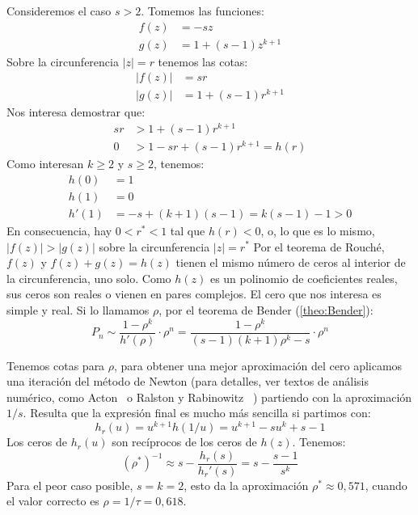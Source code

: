   Consideremos el caso \(s > 2\).
  Tomemos las funciones:
  \begin{align*}
    f(z)
      &= -s z \\
    g(z)
      &= 1 + (s - 1) z^{k + 1}
  \end{align*}
  Sobre la circunferencia \(\lvert z \rvert = r\)
  tenemos las cotas:
  \begin{align*}
    \lvert f(z) \rvert
      &= s r \\
    \lvert g(z) \rvert
      &= 1 + (s - 1) r^{k + 1}
  \end{align*}
  Nos interesa demostrar que:
  \begin{align*}
    s r
      &> 1 + (s - 1) r^{k + 1} \\
    0 &> 1 - s r + (s - 1) r^{k + 1}
       = h(r)
  \end{align*}
  Como interesan \(k \ge 2\) y \(s \ge 2\),
  tenemos:
  \begin{align*}
    h(0)
      &= 1 \\
    h(1)
      &= 0 \\
    h'(1)
      &= - s + (k + 1) (s - 1)
       = k (s - 1) - 1
       > 0
  \end{align*}
  En consecuencia,
  hay \(0 < r^* < 1\) tal que \(h(r) < 0\),
  o,
  lo que es lo mismo,
  \(\lvert f(z) \rvert > \lvert g(z) \rvert\)
  sobre la circunferencia \(\lvert z \rvert = r^*\)
  Por el teorema de Rouché,
  \(f(z)\) y \(f(z) + g(z) = h(z)\) tienen el mismo número de ceros
  al interior de la circunferencia,
  uno solo.
  Como \(h(z)\) es un polinomio de coeficientes reales,
  sus ceros son reales o vienen en pares complejos.
  El cero que nos interesa es simple y real.
  Si lo llamamos \(\rho\),
  por el teorema de Bender
  (\ref{theo:Bender}):
  \begin{equation}
    \label{eq:asymptotic-strings-no-ak}
    P_n
      \sim \frac{1 - \rho^k}{h'(\rho)} \cdot \rho^n
      = \frac{1 - \rho^k}{(s - 1) (k + 1) \rho^k - s} \cdot \rho^n
  \end{equation}

  Tenemos cotas para \(\rho\),
  para obtener una mejor aproximación del cero
  aplicamos una iteración del método de Newton%
  (para detalles,
   ver textos de análisis numérico,
   como Acton~%
     \cite[capítulo~2]{acton90:_numerical_methods_work}
   o Ralston y Rabinowitz~%
     \cite[capítulo~8]{ralston12:_first_cours_numer_analy})
  partiendo con la aproximación \(1 / s\).
  Resulta que la expresión final
  es mucho más sencilla si partimos con:
  \begin{equation*}
    h_r(u)
      = u^{k + 1} h(1 / u)
      = u^{k + 1} - s u^k + s - 1
  \end{equation*}
  Los ceros de \(h_r(u)\) son recíprocos de los ceros de \(h(z)\).
  Tenemos:
  \begin{equation*}
    (\rho^*)^{-1}
      \approx s - \frac{h_r(s)}{h_r'(s)}
      = s - \frac{s - 1}{s^k}
  \end{equation*}
  Para el peor caso posible,
  \(s = k = 2\),
  esto da la aproximación \(\rho^* \approx 0,571\),
  cuando el valor correcto es \(\rho = 1 / \tau = 0,618\).

